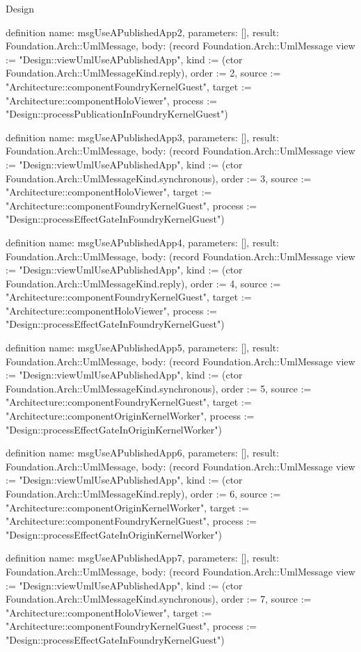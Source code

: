 \begin{lexlean}{Design}
\begin{semanticmodule}
definition{
  name: msgUseAPublishedApp2,
  parameters: [],
  result: Foundation.Arch::UmlMessage,
  body: (record Foundation.Arch::UmlMessage {view := "Design::viewUmlUseAPublishedApp", kind := (ctor Foundation.Arch::UmlMessageKind.reply), order := 2, source := "Architecture::componentFoundryKernelGuest", target := "Architecture::componentHoloViewer", process := "Design::processPublicationInFoundryKernelGuest"})
}

definition{
  name: msgUseAPublishedApp3,
  parameters: [],
  result: Foundation.Arch::UmlMessage,
  body: (record Foundation.Arch::UmlMessage {view := "Design::viewUmlUseAPublishedApp", kind := (ctor Foundation.Arch::UmlMessageKind.synchronous), order := 3, source := "Architecture::componentHoloViewer", target := "Architecture::componentFoundryKernelGuest", process := "Design::processEffectGateInFoundryKernelGuest"})
}

definition{
  name: msgUseAPublishedApp4,
  parameters: [],
  result: Foundation.Arch::UmlMessage,
  body: (record Foundation.Arch::UmlMessage {view := "Design::viewUmlUseAPublishedApp", kind := (ctor Foundation.Arch::UmlMessageKind.reply), order := 4, source := "Architecture::componentFoundryKernelGuest", target := "Architecture::componentHoloViewer", process := "Design::processEffectGateInFoundryKernelGuest"})
}

definition{
  name: msgUseAPublishedApp5,
  parameters: [],
  result: Foundation.Arch::UmlMessage,
  body: (record Foundation.Arch::UmlMessage {view := "Design::viewUmlUseAPublishedApp", kind := (ctor Foundation.Arch::UmlMessageKind.synchronous), order := 5, source := "Architecture::componentFoundryKernelGuest", target := "Architecture::componentOriginKernelWorker", process := "Design::processEffectGateInOriginKernelWorker"})
}

definition{
  name: msgUseAPublishedApp6,
  parameters: [],
  result: Foundation.Arch::UmlMessage,
  body: (record Foundation.Arch::UmlMessage {view := "Design::viewUmlUseAPublishedApp", kind := (ctor Foundation.Arch::UmlMessageKind.reply), order := 6, source := "Architecture::componentOriginKernelWorker", target := "Architecture::componentFoundryKernelGuest", process := "Design::processEffectGateInOriginKernelWorker"})
}

definition{
  name: msgUseAPublishedApp7,
  parameters: [],
  result: Foundation.Arch::UmlMessage,
  body: (record Foundation.Arch::UmlMessage {view := "Design::viewUmlUseAPublishedApp", kind := (ctor Foundation.Arch::UmlMessageKind.synchronous), order := 7, source := "Architecture::componentHoloViewer", target := "Architecture::componentFoundryKernelGuest", process := "Design::processEffectGateInFoundryKernelGuest"})
}


\end{semanticmodule}
\end{lexlean}
